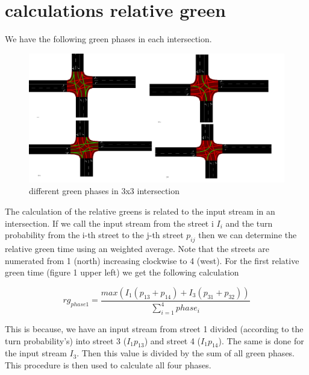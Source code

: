 \documentclass[11pt]{scrartcl}
\begin{document}
	\section*{calculations relative green}
	
	We have the following green phases in each intersection. 
	
	\begin{figure}[H]
		\centering
		\includegraphics[width=1.2\linewidth]{greenPhases}
		\caption{different green phases in 3x3 intersection}
		\label{fig:greenphases}
	\end{figure}
	
	The calculation of the relative greens is related to the input stream in an intersection. If we call the input stream from the street i $I_{i}$ and the turn probability from the i-th street to the j-th street $p_{ij}$ then we can determine the relative green time using an weighted average. Note that the streets are numerated from 1 (north) increasing clockwise to 4 (west). For the first relative green time (figure 1 upper left) we get the following calculation
	
	\begin{equation}\label{key}
	rg_{phase 1} = \frac{max(I_{1}(p_{13} + p_{14})+I_{3}(p_{31}+p_{32}))}{\sum_{i=1}^{4}phase_{i}} 
	\end{equation}
	
	This is because, we have an input stream from street 1 divided (according to the turn probability's) into street 3 ($I_{1}p_{13}$) and street 4 ($I_{1}p_{14}$). The same is done for the input stream $I_{3}$. Then this value is divided by the sum of all green phases. This procedure is then used to calculate all four phases.
	
	
\end{document}
